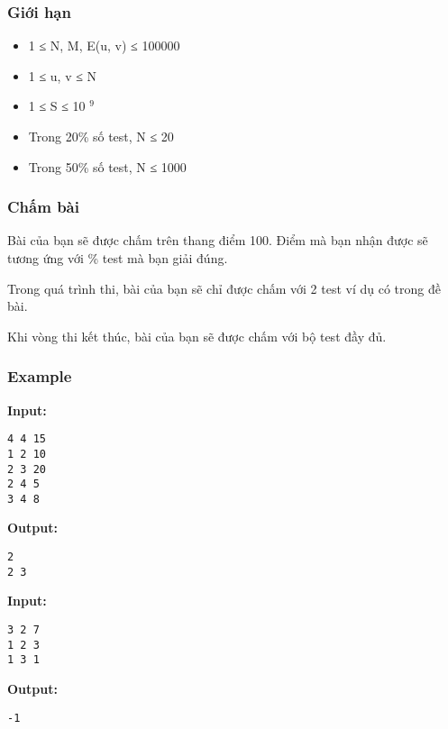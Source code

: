 \subsubsection{Giới hạn}
\begin{itemize}
	\item 1 ≤ N, M, E(u, v) ≤ 100000
	\item 1 ≤ u, v ≤ N
	\item 1 ≤ S ≤ 10 $^ 9 $
	\item Trong 20\% số test, N ≤ 20
	\item Trong 50\% số test, N ≤ 1000
\end{itemize}

\subsubsection{Chấm bài}

Bài của bạn sẽ được chấm trên thang điểm 100. Điểm mà bạn nhận được sẽ tương ứng với \% test mà bạn giải đúng.

Trong quá trình thi, bài của bạn sẽ chỉ được chấm với 2 test ví dụ có trong đề bài.

Khi vòng thi kết thúc, bài của bạn sẽ được chấm với bộ test đầy đủ.

\subsubsection{Example}

\textbf{Input: }
\begin{verbatim}
4 4 15
1 2 10
2 3 20
2 4 5
3 4 8
\end{verbatim}

\textbf{Output: }
\begin{verbatim}
2
2 3 
\end{verbatim}

\textbf{Input: }
\begin{verbatim}
3 2 7
1 2 3
1 3 1
\end{verbatim}

\textbf{Output: }
\begin{verbatim}
-1 \end{verbatim}